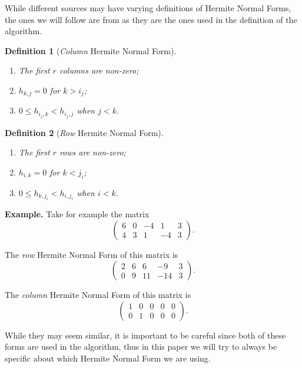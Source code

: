 \documentclass[oneside, a4paper, onecolumn, 11pt]{article}
\newtheorem{definition}{Definition}
\newenvironment{example}[1][Example]{\textbf{#1.} }{\medskip}
\begin{document}
While different sources may have varying definitions of Hermite Normal Forms, the ones we will follow are from \cite{Hubert2013} as they are the ones used in the definition of the algorithm.

\begin{definition}[\textit{Column} Hermite Normal Form]
    \begin{enumerate}[label=(\roman*)]
        \item The first \(r\) columns are non-zero;
        \item \(h_{k, j} = 0\) for \(k > i_j\);
        \item \(0 \le h_{i_j, k} < h_{i_j, j}\) when \(j < k\).
    \end{enumerate}
\end{definition}

\begin{definition}[\textit{Row} Hermite Normal Form]
    \begin{enumerate}[label=(\roman*)]
        \item The first \(r\) rows are non-zero;
        \item \(h_{i, k} = 0\) for \(k < j_i\);
        \item \(0 \le h_{k, j_i} < h_{i, j_i}\) when \(i < k\).
    \end{enumerate}
\end{definition}

\begin{example}
    Take for example the matrix
    \[
        \begin{pmatrix}
            6 & 0 & -4 & 1  & 3 \\
            4 & 3 & 1  & -4 & 3
        \end{pmatrix}.
    \]

    The \textit{row} Hermite Normal Form of this matrix is
    \[
        \begin{pmatrix}
            2 & 6 & 6  & -9  & 3 \\
            0 & 9 & 11 & -14 & 3
        \end{pmatrix}.
    \]

    The \textit{column} Hermite Normal Form of this matrix is
    \[
        \begin{pmatrix}
            1 & 0 & 0 & 0 & 0 \\
            0 & 1 & 0 & 0 & 0
        \end{pmatrix}.
    \]
\end{example}

While they may seem similar, it is important to be careful since both of these forms are used in the algorithm, thus in this paper we will try to always be specific about which Hermite Normal Form we are using.
\end{document}
